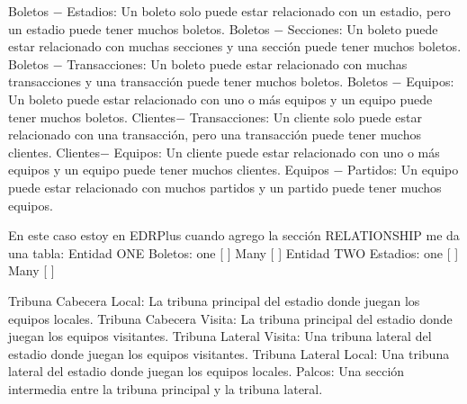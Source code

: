 Boletos $-$ Estadios: Un boleto solo puede estar relacionado con un estadio, pero un estadio puede tener muchos boletos.
Boletos $-$ Secciones: Un boleto puede estar relacionado con muchas secciones y una sección puede tener muchos boletos.
Boletos $-$ Transacciones: Un boleto puede estar relacionado con muchas transacciones y una transacción puede tener muchos boletos.
Boletos $-$ Equipos: Un boleto puede estar relacionado con uno o más equipos y un equipo puede tener muchos boletos.
Clientes$-$ Transacciones: Un cliente solo puede estar relacionado con una transacción, pero una transacción puede tener muchos clientes.
Clientes$-$ Equipos: Un cliente puede estar relacionado con uno o más equipos y un equipo puede tener muchos clientes.
Equipos $-$ Partidos: Un equipo puede estar relacionado con muchos partidos y un partido puede tener muchos equipos.


En este caso estoy en EDRPlus 
cuando agrego la sección RELATIONSHIP me da una tabla:
Entidad ONE
 Boletos: 
               one [ ]
               Many [ ]
Entidad TWO
 Estadios: 
               one [ ]
               Many [ ]

Tribuna Cabecera Local: La tribuna principal del estadio donde juegan los equipos locales.
Tribuna Cabecera Visita: La tribuna principal del estadio donde juegan los equipos visitantes.
Tribuna Lateral Visita: Una tribuna lateral del estadio donde juegan los equipos visitantes.
Tribuna Lateral Local: Una tribuna lateral del estadio donde juegan los equipos locales.
Palcos: Una sección intermedia entre la tribuna principal y la tribuna lateral.